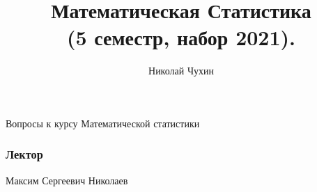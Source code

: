 \documentclass[a4paper,14pt]{extarticle}
\title{Математическая Статистика \\
  (5 семестр, набор 2021).}
\author{
 Николай Чухин
}
\theoremstyle{definition}
\theoremstyle{plain}
\theoremstyle{plain}
\theoremstyle{plain}
\theoremstyle{plain}
\theoremstyle{definition}
\theoremstyle{definition}
\theoremstyle{definition}
\theoremstyle{definition}
\theoremstyle{definition}
\theoremstyle{definition}
\theoremstyle{definition}
\theoremstyle{plain}
\theoremstyle{plain}
\theoremstyle{plain}
\theoremstyle{plain}
\theoremstyle{plain}
\theoremstyle{definition}
\theoremstyle{definition}
\theoremstyle{definition}
\theoremstyle{definition}
\theoremstyle{definition}
\theoremstyle{definition}
\begin{document}
\maketitle

Вопросы к курсу Математической статистики
\subsubsection*{Лектор}
Максим Сергеевич Николаев 


\end{document}
